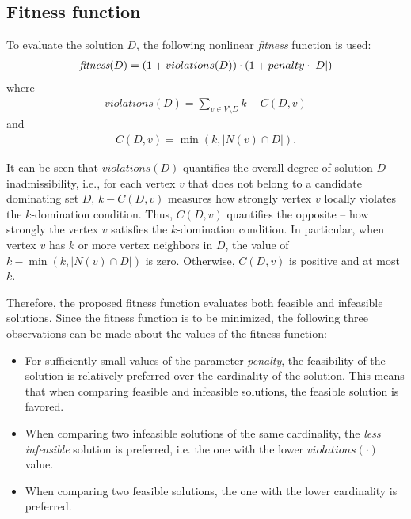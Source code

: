 \documentclass[dvipsnames,format=sigconf]{acmart} %
\begin{document}
\subsection{Fitness function}\label{subsec:fit}
   To evaluate the solution $D$, the following nonlinear \emph{fitness} function is used:
   \begin{align}\label{eq:fitness}
      \emph{fitness}(D) = ( 1 + violations(D)) \cdot ( 1+ penalty \cdot |D|)
   \end{align}
   where 
   \begin{align}
   	   violations(D) = \sum_{v \in V \setminus D}{k-C(D, v)}
   \end{align}
   and 
   \begin{align}
   	 C(D, v) = \min(k, |N(v) \cap D|).
   \end{align}

It can be seen that $violations(D)$ quantifies the overall degree of solution $D$ inadmissibility, i.e., for each vertex $v$ that does not belong to a candidate dominating set $D$, $k-C(D, v)$ measures how strongly vertex $v$ locally violates the $k$-domination condition. Thus, $C(D, v)$ quantifies the opposite -- how strongly the vertex $v$ satisfies the $k$-domination condition. In particular, when vertex $v$ has $k$ or more vertex neighbors in $D$, the value of $k - \min(k, |N(v) \cap D|)$ is zero. Otherwise, $C(D, v)$ is positive and at most $k$. 

Therefore, the proposed fitness function evaluates both feasible and infeasible solutions. Since the fitness function is to be minimized, the following three observations can be made about the values of the fitness function:
\begin{itemize}
 		\item For sufficiently small values of the parameter \emph{penalty}, the feasibility of the solution is relatively preferred over the cardinality of the solution. This means that when comparing feasible and infeasible solutions, the feasible solution is favored. 
 
     	\item When comparing two infeasible solutions of the same cardinality, the \emph{less infeasible} solution is preferred, i.e. the one with the lower $violations(\cdot)$ value.  
        
        \item When comparing two feasible solutions, the one with the lower cardinality is preferred.
\end{itemize}
\end{document}
